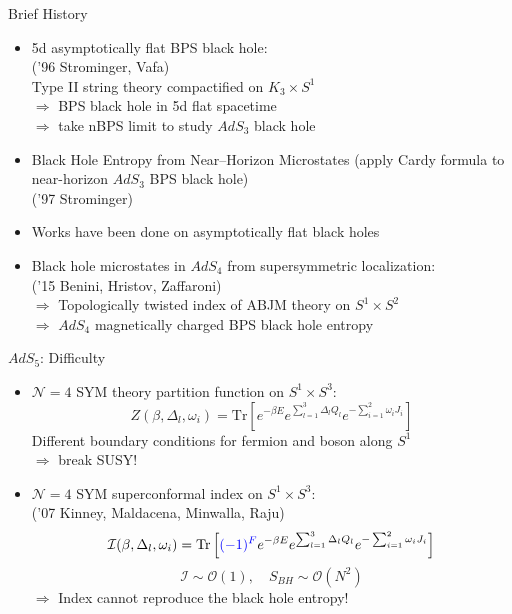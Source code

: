 \documentclass{beamer}
\begin{document}
\begin{frame}{Brief History}
\begin{itemize}
    \item 5d asymptotically flat BPS black hole:\\
    {\color{blue}('96 Strominger, Vafa)}\\
    Type II string theory compactified on $K_3\times S^1$\\
    $\Rightarrow$ BPS black hole in 5d flat spacetime\\
    $\Rightarrow$ take nBPS limit to study $AdS_3$ black hole
    \item Black Hole Entropy from Near–Horizon Microstates (apply Cardy formula to near-horizon $AdS_3$ BPS black hole)\\
    {\color{blue}('97 Strominger)}
    \item Works have been done on asymptotically flat black holes
    \item Black hole microstates in $AdS_{4}$ from supersymmetric localization: \\
    {\color{blue}('15 Benini, Hristov, Zaffaroni)}\\
    $\Rightarrow$ Topologically twisted index of ABJM theory on $S^1\times S^2$\\
    $\Rightarrow$ $AdS_4$ magnetically charged BPS black hole entropy
\end{itemize}
\end{frame}
\begin{frame}{$AdS_5$: Difficulty}
    \begin{itemize}
        \item $\mathcal{N}=4$ SYM theory partition function on $S^1\times S^3$:
        \begin{equation*}
            Z(\beta,\Delta_l,\omega_i)=\mathrm{Tr}\left[e^{-\beta E}e^{\sum_{l=1}^3\Delta_lQ_l}e^{-\sum_{i=1}^2\omega_iJ_i}\right]
        \end{equation*}
        Different boundary conditions for fermion and boson along $S^1$\\
        $\Rightarrow$ break SUSY!
        \item $\mathcal{N}=4$ SYM superconformal index on $S^1\times S^3$: \\
        {\color{blue}('07 Kinney, Maldacena, Minwalla, Raju)}
        \begin{equation*}
            \mathcal{I}(\beta,\Delta_l,\omega_i)=\mathrm{Tr}\left[{\color{blue}(-1)^{F}}e^{-\beta E}e^{\sum_{l=1}^3\Delta_lQ_l}e^{-\sum_{i=1}^2\omega_iJ_i}\right]
        \end{equation*}
        \begin{equation*}
            \mathcal{I}\sim \mathcal{O}(1),\quad S_{BH}\sim\mathcal{O}(N^2)
        \end{equation*}
        $\Rightarrow$ Index cannot reproduce the black hole entropy!
    \end{itemize}
\end{frame}
\end{document}
